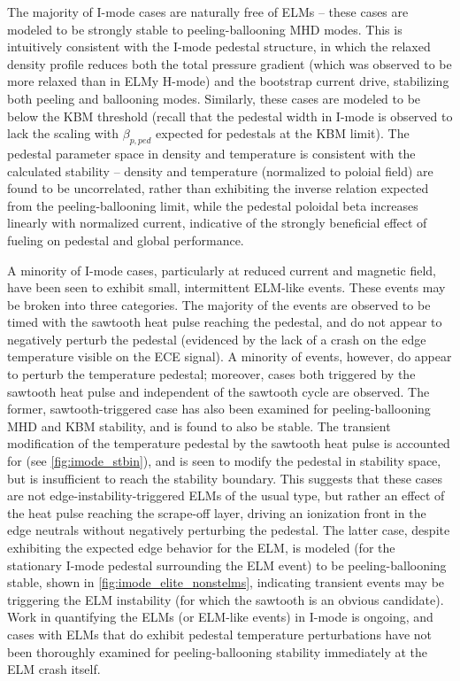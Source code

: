 The majority of I-mode cases are naturally free of ELMs -- these cases are modeled to be strongly stable to peeling-ballooning MHD modes.  This is intuitively consistent with the I-mode pedestal structure, in which the relaxed density profile reduces both the total pressure gradient (which was observed to be more relaxed than in ELMy H-mode) and the bootstrap current drive, stabilizing both peeling and ballooning modes.  Similarly, these cases are modeled to be below the KBM threshold (recall that the pedestal width in I-mode is observed to lack the scaling with $\beta_{p,ped}$ expected for pedestals at the KBM limit).  The pedestal parameter space in density and temperature is consistent with the calculated stability -- density and temperature (normalized to poloial field) are found to be uncorrelated, rather than exhibiting the inverse relation expected from the peeling-ballooning limit, while the pedestal poloidal beta increases linearly with normalized current, indicative of the strongly beneficial effect of fueling on pedestal and global performance.

A minority of I-mode cases, particularly at reduced current and magnetic field, have been seen to exhibit small, intermittent ELM-like events.  These events may be broken into three categories.  The majority of the events are observed to be timed with the sawtooth heat pulse reaching the pedestal, and do not appear to negatively perturb the pedestal (evidenced by the lack of a crash on the edge temperature visible on the ECE signal).  A minority of events, however, do appear to perturb the temperature pedestal; moreover, cases both triggered by the sawtooth heat pulse and independent of the sawtooth cycle are observed.  The former, sawtooth-triggered case has also been examined for peeling-ballooning MHD and KBM stability, and is found to also be stable.  The transient modification of the temperature pedestal by the sawtooth heat pulse is accounted for (see \cref{fig:imode_stbin}), and is seen to modify the pedestal in stability space, but is insufficient to reach the stability boundary.  This suggests that these cases are not edge-instability-triggered ELMs of the usual type, but rather an effect of the heat pulse reaching the scrape-off layer, driving an ionization front in the edge neutrals without negatively perturbing the pedestal.  The latter case, despite exhibiting the expected edge behavior for the ELM, is modeled (for the stationary I-mode pedestal surrounding the ELM event) to be peeling-ballooning stable, shown in \cref{fig:imode_elite_nonstelms}, indicating transient events may be triggering the ELM instability (for which the sawtooth is an obvious candidate).  Work in quantifying the ELMs (or ELM-like events) in I-mode is ongoing, and cases with ELMs that do exhibit pedestal temperature perturbations have not been thoroughly examined for peeling-ballooning stability immediately at the ELM crash itself.\nicesectionending

